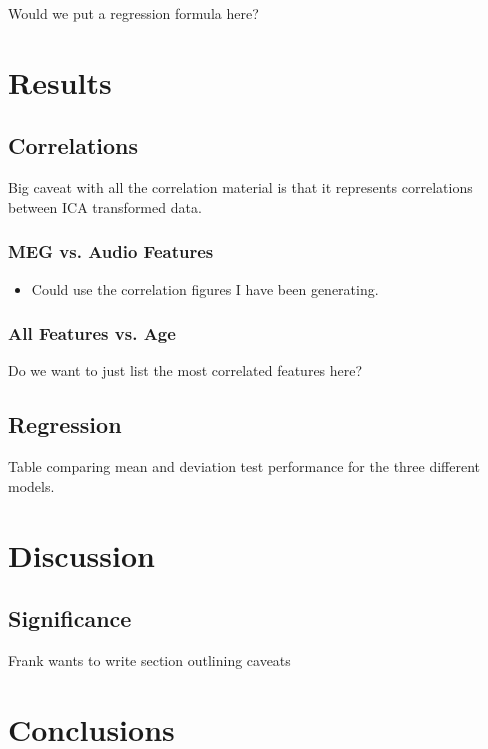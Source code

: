 \documentclass[a4paper]{article}
\begin{document}
Would we put a regression formula here?

\section{Results}

\subsection{Correlations}

Big caveat with all the correlation material is that it represents correlations between ICA transformed data.

\subsubsection{MEG vs. Audio Features}

\begin{itemize}
\item Could use the correlation figures I have been generating.
\end{itemize}


\subsubsection{All Features vs. Age}

Do we want to just list the most correlated features here?

\subsection{Regression}

Table comparing mean and deviation test performance for the three different models.

\section{Discussion}

\subsection{Significance}

Frank wants to write section outlining caveats

\section{Conclusions}
\end{document}
